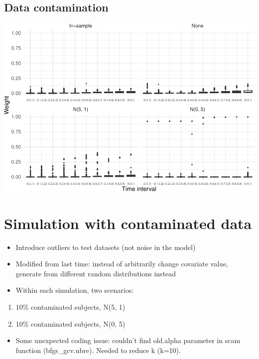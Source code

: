 \documentclass[
]{article}
\providecommand{\tightlist}{%
  \setlength{\itemsep}{0pt}\setlength{\parskip}{0pt}}
\begin{document}
\hypertarget{data-contamination}{%
\subsection{Data contamination}\label{data-contamination}}

\includegraphics{ProgressReport_files/figure-latex/boxp_wt_contam-1.pdf}

\hypertarget{simulation-with-contaminated-data}{%
\section{Simulation with contaminated
data}\label{simulation-with-contaminated-data}}

\begin{itemize}
\tightlist
\item
  Introduce outliers to test datasets (not noise in the model)
\item
  Modified from last time: instead of arbitrarily change covariate
  value, generate from different random distributions instead
\item
  Within each simulation, two scenarios:
\end{itemize}

\begin{enumerate}
\def\labelenumi{\arabic{enumi}.}
\tightlist
\item
  10\% contaminated subjects, N(5, 1)
\item
  10\% contaminated subjects, N(0, 5)
\end{enumerate}

\begin{itemize}
\tightlist
\item
  Some unexpected coding issue: couldn't find old.alpha parameter in
  scam function (bfgs\_gcv.ubre). Needed to reduce k (k=10).
\end{itemize}
\end{document}
